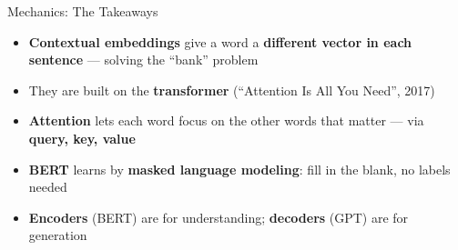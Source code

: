 \documentclass[aspectratio=169]{beamer}
\begin{document}
\begin{frame}{Mechanics: The Takeaways}
\vspace{0.25cm}
\begin{itemize}\setlength\itemsep{7pt}
  \item[\textcolor{wurgreen}{\faCheck}]
    \textbf{Contextual embeddings} give a word a \textbf{different vector in each sentence} ---
    solving the ``bank'' problem
  \item[\textcolor{wurgreen}{\faCheck}]
    They are built on the \textbf{transformer} (``Attention Is All You Need'', 2017)
  \item[\textcolor{wurgreen}{\faCheck}]
    \textbf{Attention} lets each word focus on the other words that matter ---
    via \textbf{query, key, value}
  \item[\textcolor{wurgreen}{\faCheck}]
    \textbf{BERT} learns by \textbf{masked language modeling}: fill in the blank, no labels needed
  \item[\textcolor{wurgreen}{\faCheck}]
    \textbf{Encoders} (BERT) are for understanding; \textbf{decoders} (GPT) are for generation
\end{itemize}

\medskip
{}
\end{frame}
\end{document}
